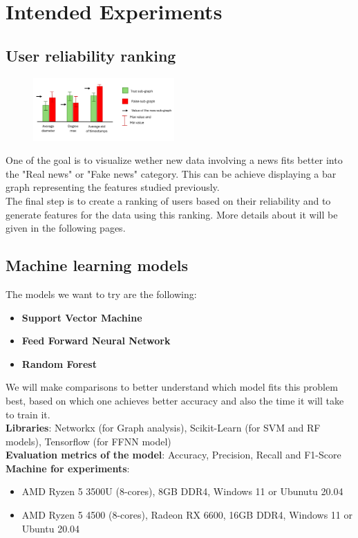 \documentclass[11pt,a4paper]{article}
\begin{document}
\section*{Intended Experiments}

\subsection*{User reliability ranking}
\begin{figure}
	\begin{center}
	  \includegraphics[width=0.48\textwidth]{results}
	\end{center}
\end{figure}
One of the goal is to visualize wether new data involving a news fits better into the "Real news" or "Fake news" category. This can be achieve displaying a bar graph representing the features studied previously.\\
The final step is to create a ranking of users based on their reliability and to generate features for the data using this ranking. More details about it will be given in the following pages.

\subsection*{Machine learning models}

The models we want to try are the following:
\begin{itemize}
	\setlength\itemsep{-0.3em}
	\item \textbf{Support Vector Machine}
	\item \textbf{Feed Forward Neural Network}
	\item \textbf{Random Forest}
\end{itemize}

We will make comparisons to better understand which model fits this problem best, based on which one achieves better accuracy and also the time it will take to train it.
\\\textbf{Libraries}: Networkx\cite{networkx} (for Graph analysis), Scikit-Learn\cite{scikit} (for SVM and RF models), Tensorflow\cite{tensor} (for FFNN model)
\\\textbf{Evaluation metrics of the model}: Accuracy, Precision, Recall and F1-Score
\\\textbf{Machine for experiments}: 
\begin{itemize}
	\setlength\itemsep{-0.3em}
	\item AMD Ryzen 5 3500U (8-cores), 8GB DDR4, Windows 11 or Ubunutu 20.04
	\item AMD Ryzen 5 4500 (8-cores), Radeon RX 6600, 16GB DDR4, Windows 11 or Ubuntu 20.04
\end{itemize}
\end{document}
